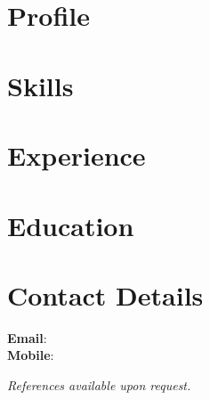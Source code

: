 \documentclass[a4paper,10pt]{article}
\begin{document}
\begin{center}
    {\Large \textbf{}} \\[0.2cm]
    \faEnvelope \hspace{0.1cm} \href{mailto:\VAR{email}}{} \\
    \faPhone \hspace{0.1cm} 
\end{center}
\vspace{0.5cm}

\section*{Profile}

\section*{Skills}

\section*{Experience}

\section*{Education}

\section*{Contact Details}
\textbf{Email}: \\
\textbf{Mobile}: 

\vspace{0.5cm}
\begin{center}
    \small{\textit{References available upon request.}}
\end{center}
\end{document}
